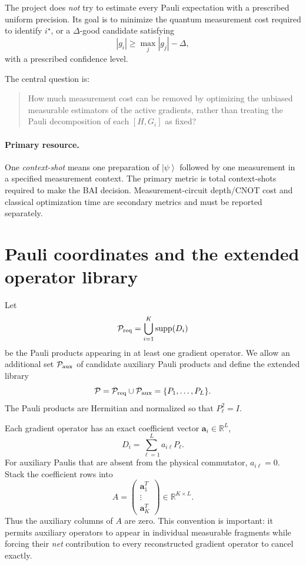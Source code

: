 \documentclass[11pt]{article}
\newcommand{\ket}[1]{\left|#1\right\rangle}
\newcommand{\supp}{\operatorname{supp}}
\newcommand{\R}{\mathbb{R}}
\newcommand{\Pset}{\mathcal P}
\begin{document}
The project does \emph{not} try to estimate every Pauli expectation with a prescribed uniform precision.  Its goal is to minimize the quantum measurement cost required to identify $i^\star$, or a $\Delta$-good candidate satisfying
\begin{equation}
  |g_i|\ge \max_j |g_j|-\Delta,
  \label{eq:delta-good}
\end{equation}
with a prescribed confidence level.

The central question is:
\begin{quote}
How much measurement cost can be removed by optimizing the unbiased measurable estimators of the active gradients, rather than treating the Pauli decomposition of each $[H,G_i]$ as fixed?
\end{quote}

\paragraph{Primary resource.}
One \emph{context-shot} means one preparation of $\ket{\psi}$ followed by one measurement in a specified measurement context.  The primary metric is total context-shots required to make the BAI decision.  Measurement-circuit depth/CNOT cost and classical optimization time are secondary metrics and must be reported separately.

\section{Pauli coordinates and the extended operator library}

Let
\begin{equation}
  \Pset_{\rm req}=\bigcup_{i=1}^{K}\supp(D_i)
\end{equation}
be the Pauli products appearing in at least one gradient operator.  We allow an additional set $\Pset_{\rm aux}$ of candidate auxiliary Pauli products and define the extended library
\begin{equation}
  \Pset=\Pset_{\rm req}\cup\Pset_{\rm aux}
  =\{P_1,\ldots,P_L\}.
  \label{eq:library}
\end{equation}
The Pauli products are Hermitian and normalized so that $P_\ell^2=I$.

Each gradient operator has an exact coefficient vector $\bm a_i\in\R^L$,
\begin{equation}
  D_i=\sum_{\ell=1}^{L}a_{i\ell}P_\ell.
  \label{eq:pauli-gradient}
\end{equation}
For auxiliary Paulis that are absent from the physical commutator, $a_{i\ell}=0$.  Stack the coefficient rows into
\begin{equation}
  A=\begin{pmatrix}\bm a_1^T\\ \vdots\\ \bm a_K^T\end{pmatrix}\in\R^{K\times L}.
  \label{eq:A}
\end{equation}
Thus the auxiliary columns of $A$ are zero.  This convention is important: it permits auxiliary operators to appear in individual measurable fragments while forcing their \emph{net} contribution to every reconstructed gradient operator to cancel exactly.
\end{document}
